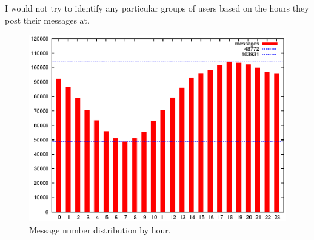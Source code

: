     I would not try to identify any particular groups of users based on the hours they post their messages at.
    \begin{figure}[H]
      \includegraphics[width=\textwidth]{chapters/03_implementation/hourly}
      \caption{Message number distribution by hour.}
      \label{fig:dist_hour}
    \end{figure}